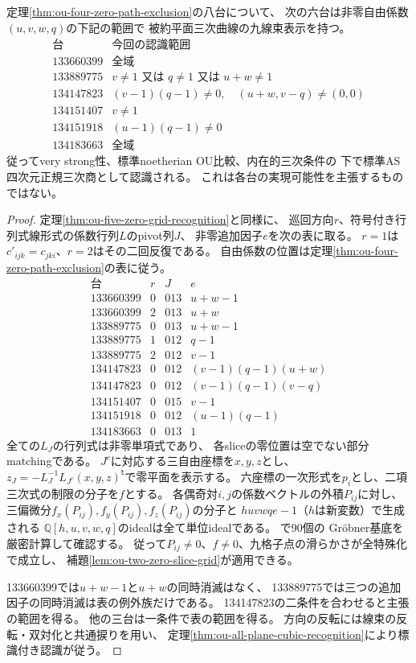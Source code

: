 \begin{theorem}[四零係数の六族の認識範囲]
\label{thm:ou-four-zero-grid-recognition}
定理\ref{thm:ou-four-zero-path-exclusion}の八台について、
次の六台は非零自由係数$(u,v,w,q)$の下記の範囲で
被約平面三次曲線の九線束表示を持つ。
\[
\begin{array}{r|l}
\text{台}&\text{今回の認識範囲}\\ \hline
133660399&\text{全域}\\
133889775&v\ne1\text{ 又は }q\ne1\text{ 又は }u+w\ne1\\
134147823&(v-1)(q-1)\ne0,\quad
            (u+w,v-q)\ne(0,0)\\
134151407&v\ne1\\
134151918&(u-1)(q-1)\ne0\\
134183663&\text{全域}
\end{array}
\]
従ってvery strong性、標準noetherian OU比較、内在的三次条件の
下で標準AS四次元正規三次商として認識される。
これは各台の実現可能性を主張するものではない。
\end{theorem}
\begin{proof}
定理\ref{thm:ou-five-zero-grid-recognition}と同様に、
巡回方向$r$、符号付き行列式線形式の係数行列$L$のpivot列$J$、
非零追加因子$e$を次の表に取る。
$r=1$は$c'_{ijk}=c_{jki}$、$r=2$はその二回反復である。
自由係数の位置は定理\ref{thm:ou-four-zero-path-exclusion}の表に従う。
\[
\begin{array}{r|c|c|l}
\text{台}&r&J&e\\ \hline
133660399&0&013&u+w-1\\
133660399&2&013&u+w\\
133889775&0&013&u+w-1\\
133889775&1&012&q-1\\
133889775&2&012&v-1\\
134147823&0&012&(v-1)(q-1)(u+w)\\
134147823&0&012&(v-1)(q-1)(v-q)\\
134151407&0&015&v-1\\
134151918&0&012&(u-1)(q-1)\\
134183663&0&013&1
\end{array}
\]
全ての$L_J$の行列式は非零単項式であり、
各sliceの零位置は空でない部分matchingである。
$J^c$に対応する三自由座標を$x,y,z$とし、
$z_J=-L_J^{-1}L_{J^c}(x,y,z)^{\mathsf t}$で零平面を表示する。
六座標の一次形式を$p_i$とし、二項三次式の制限の分子を$f$とする。
各偶奇対$i,j$の係数ベクトルの外積$P_{ij}$に対し、
三偏微分$f_x(P_{ij}),f_y(P_{ij}),f_z(P_{ij})$の分子と
$huvwqe-1$（$h$は新変数）で生成される
$\mathbb Q[h,u,v,w,q]$のidealは全て単位idealである。
で90個の
Gröbner基底を厳密計算して確認する。
従って$P_{ij}\ne0$、$f\ne0$、九格子点の滑らかさが全特殊化で成立し、
補題\ref{lem:ou-two-zero-slice-grid}が適用できる。

133660399では$u+w-1$と$u+w$の同時消滅はなく、
133889775では三つの追加因子の同時消滅は表の例外族だけである。
134147823の二条件を合わせると主張の範囲を得る。
他の三台は一条件で表の範囲を得る。
方向の反転には線束の反転・双対化と共通捩りを用い、
定理\ref{thm:ou-all-plane-cubic-recognition}により標識付き認識が従う。
\end{proof}

